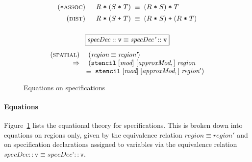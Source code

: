 \documentclass[9pt]{sigplanconf}
\theoremstyle{definition}
\begin{document}
\begin{figure}
\begin{align*}
\begin{array}{c}
\begin{array}{rll}
%
(\texttt{*}\textsc{assoc}) \;\; & R \; \texttt{*} \; (S \; \texttt{*} \; T) \; \equiv \; (R \;
                       \texttt{*} \; S) \; \texttt{*} \; T \\[0.5em]
(\textsc{dist}) \;\; & R \; \texttt{*} \; (S \; \texttt{+} \; T) \; \equiv \; (R \;
                       \texttt{*} \; S) \; \texttt{+} \; (R
                       \; \texttt{*} \; T) \\[0.5em]
\end{array} \\ \\
%
\framebox{${\textit{specDec} :: \texttt{v}} \equiv
{\textit{specDec'} :: \texttt{v}}$} \\[1em]
\begin{array}{rl}
(\textsc{spatial}) \; &
(\textit{region} \equiv \textit{region'}) \\
\Rightarrow \; & (\texttt{stencil} \; [\textit{mod}] \; [\textit{approxMod},] \;
\textit{region} \\
& \!\!\equiv \; \texttt{stencil} \; [\textit{mod}] \;
            [\textit{approxMod},] \;
\textit{region}') \\
\end{array}
\end{array}
\end{align*}
\caption{Equations on specifications}
\label{fig:equations}
\end{figure}


\paragraph{Equations}
Figure~\ref{fig:equations} lists the equational theory for
specifications. This is broken down into equations on regions only,
given by the equivalence relation $\textit{region} \equiv \textit{region}'$ and
on specification declarations assigned to variables via the equivalence relation
$\textit{specDec} :: \texttt{v} \equiv
\textit{specDec'} :: \texttt{v}$.
\end{document}
